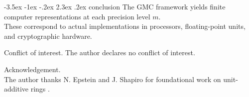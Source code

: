 \documentclass[12pt]{amsart}
\makeatletter
\theoremstyle{break}
\renewcommand\section{\@startsection{section}{1}{\z@}%
	{-3.5ex \@plus -1ex \@minus -.2ex}%
	{2.3ex \@plus.2ex}%
	{\normalfont\Large\bfseries}}
\makeatother
\begin{document}
\section{conclusion}
The GMC framework yields finite computer representations at each precision level \(m\).\\ These correspond to actual implementations in processors, floating-point units, and cryptographic hardware.

\medskip

{\sc Conflict of interest.} The author declares no conflict of interest.

\medskip

{\sc Acknowledgement.}\\ \noindent The author thanks N. Epstein and J. Shapiro for foundational work on unit-additive rings \cite{epstein2025, epstein2025b}.
\appendix
\end{document}
